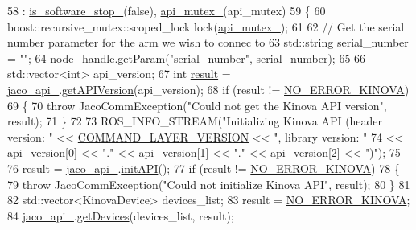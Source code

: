 \begin{DoxyCode}
58     : \hyperlink{classjaco_1_1JacoComm_a9607500fac99c4dbc5acc98dd513eec3}{is\_software\_stop\_}(\textcolor{keyword}{false}), \hyperlink{classjaco_1_1JacoComm_ac6ef2a6b3c51877fc4237d834c35908a}{api\_mutex\_}(api\_mutex)
59 \{
60     boost::recursive\_mutex::scoped\_lock lock(\hyperlink{classjaco_1_1JacoComm_ac6ef2a6b3c51877fc4237d834c35908a}{api\_mutex\_});
61 
62     \textcolor{comment}{// Get the serial number parameter for the arm we wish to connec to}
63     std::string serial\_number = \textcolor{stringliteral}{""};
64     node\_handle.getParam(\textcolor{stringliteral}{"serial\_number"}, serial\_number);
65 
66     std::vector<int> api\_version;
67     \textcolor{keywordtype}{int} \hyperlink{Kinova_8API_8CommLayerUbuntu_8h_a900dac90961bada00f57c207562a6a9a}{result} = \hyperlink{classjaco_1_1JacoComm_a8d1510c941f28a4e8f921691d4fd2248}{jaco\_api\_}.\hyperlink{classjaco_1_1JacoAPI_a90f1033a1174ea7f97d48186b7ca867a}{getAPIVersion}(api\_version);
68     \textcolor{keywordflow}{if} (result != \hyperlink{Kinova_8API_8CommLayerUbuntu_8h_a510f2320a2a31d2d225adc0da7bef595}{NO\_ERROR\_KINOVA})
69     \{
70         \textcolor{keywordflow}{throw} JacoCommException(\textcolor{stringliteral}{"Could not get the Kinova API version"}, result);
71     \}
72 
73     ROS\_INFO\_STREAM(\textcolor{stringliteral}{"Initializing Kinova API (header version: "} << 
      \hyperlink{Kinova_8API_8UsbCommandLayerUbuntu_8h_aaeb890c653dc6657b1238afe3ce1a0f9}{COMMAND\_LAYER\_VERSION} << \textcolor{stringliteral}{", library version: "}
74                     << api\_version[0] << \textcolor{stringliteral}{"."} << api\_version[1] << \textcolor{stringliteral}{"."} << api\_version[2] << \textcolor{stringliteral}{")"});
75 
76     result = \hyperlink{classjaco_1_1JacoComm_a8d1510c941f28a4e8f921691d4fd2248}{jaco\_api\_}.\hyperlink{classjaco_1_1JacoAPI_a06eae62c9dd3e144cc4275048c3129e6}{initAPI}();
77     \textcolor{keywordflow}{if} (result != \hyperlink{Kinova_8API_8CommLayerUbuntu_8h_a510f2320a2a31d2d225adc0da7bef595}{NO\_ERROR\_KINOVA})
78     \{
79         \textcolor{keywordflow}{throw} JacoCommException(\textcolor{stringliteral}{"Could not initialize Kinova API"}, result);
80     \}
81 
82     std::vector<KinovaDevice> devices\_list;
83     result = \hyperlink{Kinova_8API_8CommLayerUbuntu_8h_a510f2320a2a31d2d225adc0da7bef595}{NO\_ERROR\_KINOVA};
84     \hyperlink{classjaco_1_1JacoComm_a8d1510c941f28a4e8f921691d4fd2248}{jaco\_api\_}.\hyperlink{classjaco_1_1JacoAPI_a6f80ab16b2518ecb0ddefcd7183027c1}{getDevices}(devices\_list, result);

\end{DoxyCode}
